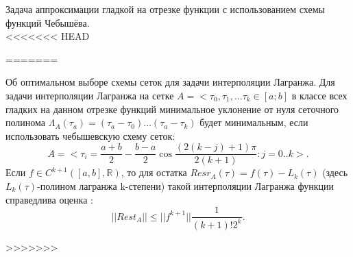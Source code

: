 \documentclass[__main__.tex]{subfiles}
\begin{document}
Задача аппроксимации гладкой на отрезке функции с использованием схемы функций Чебышёва.\\

<<<<<<< HEAD

=======
\begin{theorem}
	Об оптимальном выборе схемы сеток для задачи интерполяции Лагранжа. Для задачи интерполяции Лагранжа на сетке $A=<\tau_{0},\tau_{1},...\tau_{k}\in[a;b]$ в классе всех гладких на данном отрезке функций минимальное уклонение от нуля сеточного полинома $\Lambda_{A}(\tau_{a})=(\tau_{a}-\tau_{0})...(\tau_{a}-\tau_{k})$ будет минимальным, если использовать чебышевскую схему сеток:
	$$A=<\tau_{i}=\frac{a+b}{2}-\frac{b-a}{2}\cos\frac{(2(k-j)+1)\pi}{2(k+1)}:j=0..k>.$$
	Если $f\in C^{k+1}([a,b],\mathbb{R})$, то для остатка $Resr_{A}(\tau)=f(\tau)-L_{k}(\tau) $  (здесь $L_{k}(\tau)$-полином лагранжа k-степени) такой интерполяции Лагранжа функции справедлива оценка :
	$$||Rest_{A}||\leq||f^{k+1}||\frac{1}{(k+1)!2^{k}}. $$
\end{theorem}
>>>>>>> 
\end{document}
